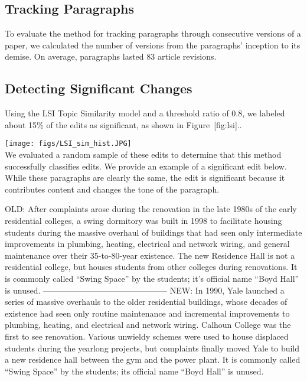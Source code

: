 \subsection{Tracking Paragraphs}\label{tracking-paragraphs-1}

To evaluate the method for tracking paragraphs through consecutive
versions of a paper, we calculated the number of versions from the
paragraphs' inception to its demise. On average, paragraphs lasted 83
article revisions.

\subsection{Detecting Significant
Changes}\label{detecting-significant-changes}

Using the LSI Topic Similarity model and a threshold ratio of 0.8, we
labeled about 15\% of the edits as significant, as shown in
Figure~{[}fig:lsi{]}..

\texttt{[image: figs/LSI\_sim\_hist.JPG]}\\

We evaluated a random sample of these edits to determine that this
method successfully classifies edits. We provide an example of a
significant edit below. While these paragraphs are clearly the same, the
edit is significant because it contributes content and changes the tone
of the paragraph.

OLD: After complaints arose during the renovation in the late 1980s of
the early residential colleges, a swing dormitory was built in 1998 to
facilitate housing students during the massive overhaul of buildings
that had seen only intermediate improvements in plumbing, heating,
electrical and network wiring, and general maintenance over their
35-to-80-year existence. The new Residence Hall is not a residential
college, but houses students from other colleges during renovations. It
is commonly called ``Swing Space'' by the students; it's official name
``Boyd Hall'' is unused. ---------------------------------------------
NEW: In 1990, Yale launched a series of massive overhauls to the older
residential buildings, whose decades of existence had seen only routine
maintenance and incremental improvements to plumbing, heating, and
electrical and network wiring. Calhoun College was the first to see
renovation. Various unwieldy schemes were used to house displaced
students during the yearlong projects, but complaints finally moved Yale
to build a new residence hall between the gym and the power plant. It is
commonly called ``Swing Space'' by the students; its official name
``Boyd Hall'' is unused.

